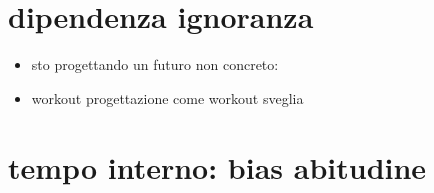 \section{dipendenza ignoranza}

\begin{itemize}
\item sto progettando un futuro non concreto: 
\item workout progettazione come workout sveglia
\end{itemize}

\section{tempo interno: bias abitudine}

